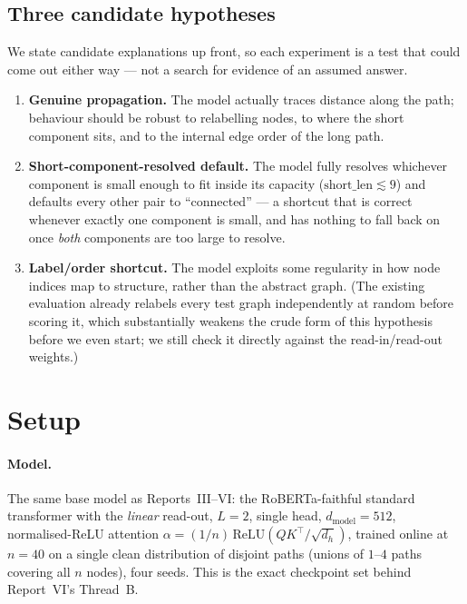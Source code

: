 \documentclass[11pt,a4paper]{article}
\begin{document}
\subsection{Three candidate hypotheses}
\label{sec:hypotheses}

We state candidate explanations up front, so each experiment is a test that could
come out either way --- not a search for evidence of an assumed answer.

\begin{enumerate}\setlength\itemsep{0.15em}
  \item \textbf{Genuine propagation.} The model actually traces distance along the
        path; behaviour should be robust to relabelling nodes, to where the short
        component sits, and to the internal edge order of the long path.
  \item \textbf{Short-component-resolved default.} The model fully resolves
        whichever component is small enough to fit inside its capacity
        ($\mathrm{short\_len}\lesssim9$) and defaults every other pair to
        ``connected'' --- a shortcut that is correct whenever exactly one
        component is small, and has nothing to fall back on once \emph{both}
        components are too large to resolve.
  \item \textbf{Label/order shortcut.} The model exploits some regularity in how
        node indices map to structure, rather than the abstract graph. (The
        existing evaluation already relabels every test graph independently at
        random before scoring it, which substantially weakens the crude form of
        this hypothesis before we even start; we still check it directly against
        the read-in/read-out weights.)
\end{enumerate}

\section{Setup}
\label{sec:setup}

\paragraph{Model.} The same base model as Reports~III--VI: the RoBERTa-faithful
standard transformer with the \emph{linear} read-out, $L=2$, single head,
$d_{\mathrm{model}}=512$, normalised-ReLU attention $\alpha=(1/n)\,\mathrm{ReLU}
(QK^\top/\sqrt{d_h})$, trained online at $n=40$ on a single clean distribution of
disjoint paths (unions of $1$--$4$ paths covering all $n$ nodes), four seeds. This
is the exact checkpoint set behind Report~VI's Thread~B.
\end{document}
